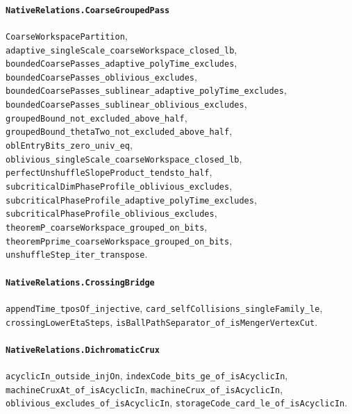 \paragraph{\texttt{NativeRelations.CoarseGroupedPass}}
{\small\raggedright \texttt{CoarseWorkspacePartition}, \texttt{adaptive\_singleScale\_coarseWorkspace\_closed\_lb}, \texttt{boundedCoarsePasses\_adaptive\_polyTime\_excludes}, \texttt{boundedCoarsePasses\_oblivious\_excludes}, \texttt{boundedCoarsePasses\_sublinear\_adaptive\_polyTime\_excludes}, \texttt{boundedCoarsePasses\_sublinear\_oblivious\_excludes}, \texttt{groupedBound\_not\_excluded\_above\_half}, \texttt{groupedBound\_thetaTwo\_not\_excluded\_above\_half}, \texttt{oblEntryBits\_zero\_univ\_eq}, \texttt{oblivious\_singleScale\_coarseWorkspace\_closed\_lb}, \texttt{perfectUnshuffleSlopeProduct\_tendsto\_half}, \texttt{subcriticalDimPhaseProfile\_oblivious\_excludes}, \texttt{subcriticalPhaseProfile\_adaptive\_polyTime\_excludes}, \texttt{subcriticalPhaseProfile\_oblivious\_excludes}, \texttt{theoremP\_coarseWorkspace\_grouped\_on\_bits}, \texttt{theoremPprime\_coarseWorkspace\_grouped\_on\_bits}, \texttt{unshuffleStep\_iter\_transpose}.\par}

\paragraph{\texttt{NativeRelations.CrossingBridge}}
{\small\raggedright \texttt{appendTime\_tposOf\_injective}, \texttt{card\_selfCollisions\_singleFamily\_le}, \texttt{crossingLowerEtaSteps}, \texttt{isBallPathSeparator\_of\_isMengerVertexCut}.\par}

\paragraph{\texttt{NativeRelations.DichromaticCrux}}
{\small\raggedright \texttt{acyclicIn\_outside\_injOn}, \texttt{indexCode\_bits\_ge\_of\_isAcyclicIn}, \texttt{machineCruxAt\_of\_isAcyclicIn}, \texttt{machineCrux\_of\_isAcyclicIn}, \texttt{oblivious\_excludes\_of\_isAcyclicIn}, \texttt{storageCode\_card\_le\_of\_isAcyclicIn}.\par}

